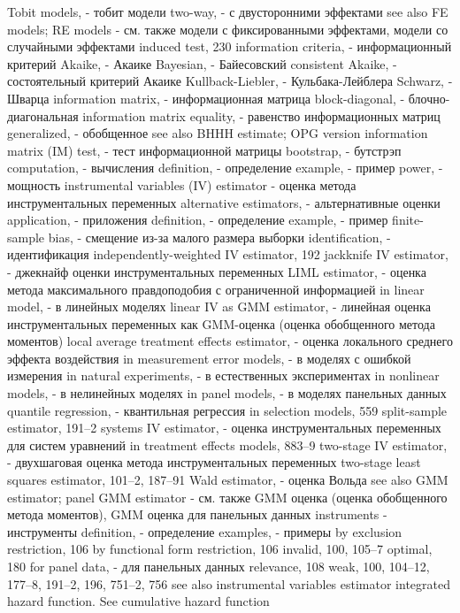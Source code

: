 Tobit models, - тобит модели
two-way, - с двусторонними эффектами
see also FE models; RE models - см. также модели с фиксированными эффектами, модели со случайными эффектами
induced test, 230
information criteria, - информационный критерий
Akaike, - Акаике
Bayesian, - Байесовский
consistent Akaike, - состоятельный критерий Акаике 
Kullback-Liebler, - Кульбака-Лейблера 
Schwarz, - Шварца
information matrix, - информационная матрица 
block-diagonal, - блочно-диагональная
information matrix equality, - равенство информационных матриц 
generalized, - обобщенное
see also BHHH estimate; OPG version
information matrix (IM) test, - тест информационной матрицы
bootstrap, - бутстрэп
computation, - вычисления
definition, - определение
example, - пример
power, - мощность
instrumental variables (IV) estimator - оценка метода инструментальных переменных
alternative estimators, - альтернативные оценки
application, - приложения
definition, - определение
example, - пример
finite-sample bias, - смещение из-за малого размера выборки 
identification, - идентификация 
independently-weighted IV estimator, 192 
jackknife IV estimator, - джекнайф оценки инструментальных переменных
LIML estimator, - оценка метода максимального правдоподобия с ограниченной информацией
in linear model, - в линейных моделях
linear IV as GMM estimator, - линейная оценка инструментальных переменных как GMM-оценка (оценка обобщенного метода моментов)
local average treatment effects estimator, - оценка локального среднего эффекта воздействия
in measurement error models, - в моделях с ошибкой измерения
in natural experiments, - в естественных экспериментах
in nonlinear models, - в нелинейных моделях
in panel models, - в моделях панельных данных
quantile regression, - квантильная регрессия
in selection models, 559
split-sample estimator, 191–2
systems IV estimator, - оценка инструментальных переменных для систем уравнений
in treatment effects models, 883–9
two-stage IV estimator, - двухшаговая оценка метода инструментальных переменных
two-stage least squares estimator, 101–2, 187–91 
Wald estimator, - оценка Вольда
see also GMM estimator; panel GMM estimator - см. также GMM оценка (оценка обобщенного метода моментов), GMM оценка для панельных данных
instruments - инструменты
definition, - определение
examples, - примеры
by exclusion restriction, 106
by functional form restriction, 106
invalid, 100, 105–7
optimal, 180
for panel data, - для панельных данных
relevance, 108
weak, 100, 104–12, 177–8, 191–2, 196, 751–2, 756 see also instrumental variables estimator
integrated hazard function. See cumulative hazard function
